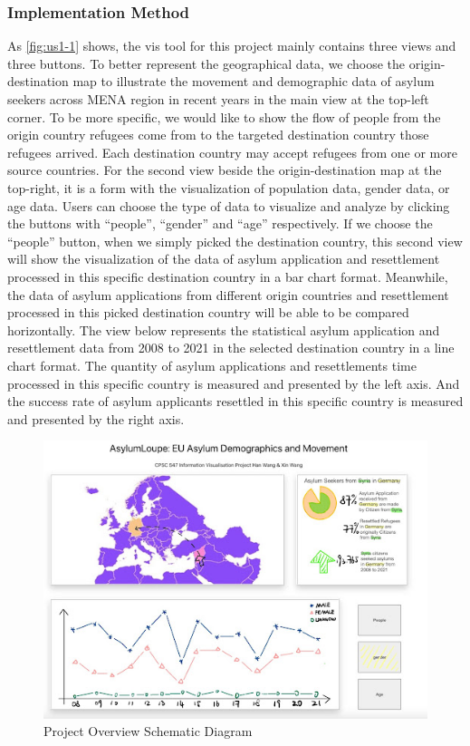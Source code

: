 \documentclass[journal]{vgtc}                %
\begin{document}
\subsubsection{Implementation Method}

As \autoref{fig:us1-1} shows, the vis tool for this project mainly contains three views and three buttons. To better represent the geographical data, we choose the origin-destination map to illustrate the movement and demographic data of asylum seekers across MENA region in recent years in the main view at the top-left corner. To be more specific, we would like to show the flow of people from the origin country refugees come from to the targeted destination country those refugees arrived. Each destination country may accept refugees from one or more source countries. For the second view beside the origin-destination map at the top-right, it is a form with the visualization of population data, gender data, or age data.  Users can choose the type of data to visualize and analyze by clicking the buttons with “people”, “gender” and “age” respectively. If we choose the “people” button, when we simply picked the destination country, this second view will show the visualization of the data of asylum application and resettlement processed in this specific destination country in a bar chart format. Meanwhile, the data of asylum applications from different origin countries and resettlement processed in this picked destination country will be able to be compared horizontally. The view below represents the statistical asylum application and resettlement data from 2008 to 2021 in the selected destination country in a line chart format. The quantity of asylum applications and resettlements time processed in this specific country is measured and presented by the left axis. And the success rate of asylum applicants resettled in this specific country is measured and presented by the right axis.

\begin{figure}[tb]
  \centering %
  \includegraphics[width=\columnwidth]{fig3}
  \caption{Project Overview Schematic Diagram}
  \label{fig:us1-2}
 \end{figure}
\end{document}
